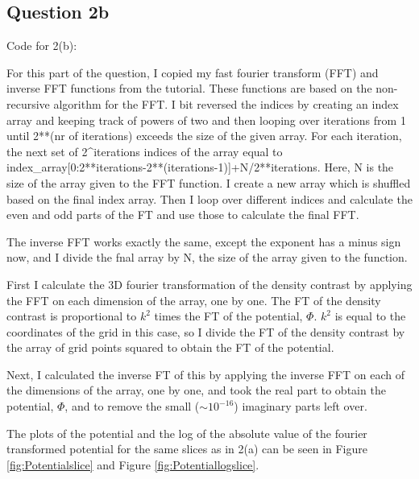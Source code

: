 \subsection{Question 2b}

Code for 2(b):


For this part of the question, I copied my fast fourier transform (FFT) and inverse FFT functions from the tutorial.
These functions are based on the non-recursive algorithm for the FFT.
I bit reversed the indices by creating an index array and keeping track of powers of two and then looping over iterations from 1 until 2**(nr of iterations) exceeds the size of the given array.
For each iteration, the next set of 2^iterations indices of the array equal to index_array[0:2**iterations-2**(iterations-1)]+N/2**iterations.
Here, N is the size of the array given to the FFT function.
I create a new array which is shuffled based on the final index array.
Then I loop over different indices and calculate the even and odd parts of the FT and use those to calculate the final FFT.

The inverse FFT works exactly the same, except the exponent has a minus sign now, and I divide the fnal array by N, the size of the array given to the function.

First I calculate the 3D fourier transformation of the density contrast by applying the FFT on each dimension of the array, one by one.
The FT of the density contrast is proportional to $k^2$ times the FT of the potential, $\Phi$.
$k^2$ is equal to the coordinates of the grid in this case, so I divide the FT of the density contrast by the array of grid points squared to obtain the FT of the potential.

Next, I calculated the inverse FT of this by applying the inverse FFT on each of the dimensions of the array, one by one, and took the real part to obtain the potential, $\Phi$, and to remove the small ($\sim 10^{-16}$) imaginary parts left over.

The plots of the potential and the log of the absolute value of the fourier transformed potential for the same slices as in 2(a) can be seen in Figure \ref{fig:Potentialslice} and Figure \ref{fig:Potentiallogslice}.

